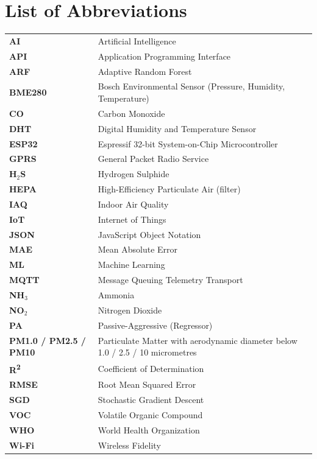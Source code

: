\chapter*{List of Abbreviations}

\begin{tabular}{@{}p{3.2cm}p{10.5cm}@{}}
\textbf{AI} & Artificial Intelligence \\
\textbf{API} & Application Programming Interface \\
\textbf{ARF} & Adaptive Random Forest \\
\textbf{BME280} & Bosch Environmental Sensor (Pressure, Humidity, Temperature) \\
\textbf{CO} & Carbon Monoxide \\
\textbf{DHT} & Digital Humidity and Temperature Sensor \\
\textbf{ESP32} & Espressif 32-bit System-on-Chip Microcontroller \\
\textbf{GPRS} & General Packet Radio Service \\
\textbf{H$_2$S} & Hydrogen Sulphide \\
\textbf{HEPA} & High-Efficiency Particulate Air (filter) \\
\textbf{IAQ} & Indoor Air Quality \\
\textbf{IoT} & Internet of Things \\
\textbf{JSON} & JavaScript Object Notation \\
\textbf{MAE} & Mean Absolute Error \\
\textbf{ML} & Machine Learning \\
\textbf{MQTT} & Message Queuing Telemetry Transport \\
\textbf{NH$_3$} & Ammonia \\
\textbf{NO$_2$} & Nitrogen Dioxide \\
\textbf{PA} & Passive-Aggressive (Regressor) \\
\textbf{PM1.0 / PM2.5 / PM10} & Particulate Matter with aerodynamic diameter below 1.0 / 2.5 / 10 micrometres \\
\textbf{R\textsuperscript{2}} & Coefficient of Determination \\
\textbf{RMSE} & Root Mean Squared Error \\
\textbf{SGD} & Stochastic Gradient Descent \\
\textbf{VOC} & Volatile Organic Compound \\
\textbf{WHO} & World Health Organization \\
\textbf{Wi-Fi} & Wireless Fidelity \\
\end{tabular}
